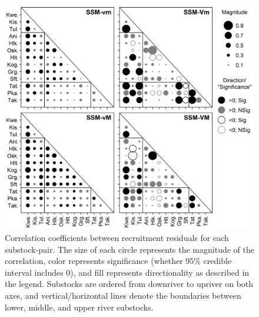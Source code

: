 \documentclass[12pt,]{book}
\theoremstyle{definition}
\theoremstyle{definition}
\theoremstyle{definition}
\theoremstyle{remark}
\begin{document}
\begin{figure}
  \centering
  \includegraphics{img/Ch4/rhos.jpg}
  \caption{Correlation coefficients between recruitment residuals for each substock-pair. The size of each circle represents the magnitude of the correlation, color represents significance (whether 95\% credible interval includes 0), and fill represents directionality as described in the legend. Substocks are ordered from downriver to upriver on both axes, and vertical/horizontal lines denote the boundaries between lower, middle, and upper river substocks.}
  \label{fig:rhos}
\end{figure}

\clearpage
\end{document}
